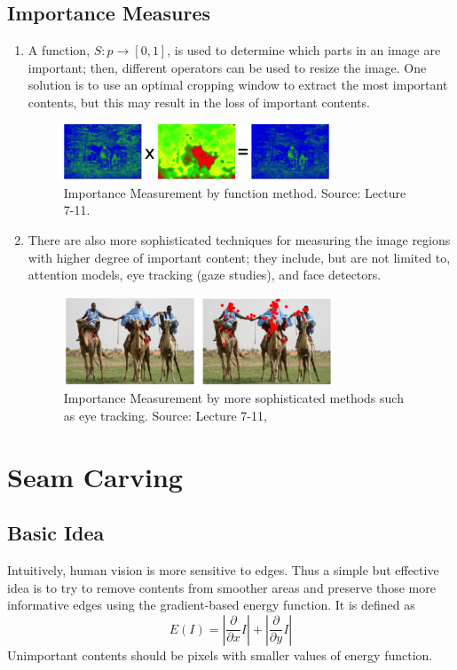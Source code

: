 \documentclass{article}
\begin{document}
\subsection{Importance Measures}
\begin{enumerate}
\item A function, $S: p \rightarrow [0,1]$, is used to determine which parts in an image are important; then, different operators can be used to resize the image. One solution is to use an optimal cropping window to extract the most important contents, but this may result in the loss of important contents.
\begin{figure}[H]
\centering
\includegraphics[width=8cm]{Function.png}
\caption{Importance Measurement by function method. Source: Lecture 7-11.}
\end{figure}
\item There are also more sophisticated techniques for measuring the image regions with higher degree of important content; they include, but are not limited to, attention models, eye tracking (gaze studies), and face detectors.
\begin{figure}[H]
\centering
\includegraphics[width=8cm]{Tracking.png}
\caption{Importance Measurement by more sophisticated methods such as eye tracking. Source: Lecture 7-11, \cite{judd2009learning}}
\end{figure}
\end{enumerate}

\section{Seam Carving}
\subsection{Basic Idea}
Intuitively, human vision is more sensitive to edges. Thus a simple but effective idea is to try to remove contents from smoother areas and preserve those more informative edges using the gradient-based energy function. It is defined as
$$
E(I) = |\frac{\partial}{\partial x}I| + |\frac{\partial}{\partial y}I|
$$
Unimportant contents should be pixels with smaller values of energy function.
\end{document}
